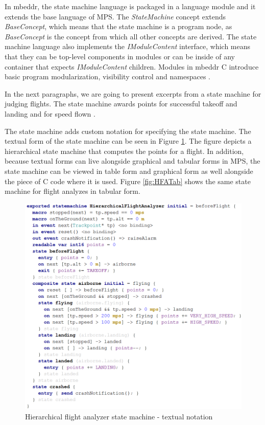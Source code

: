 \documentclass[preprint,numbers,10pt]{sigplanconf}
\begin{document}
In mbeddr, the state machine language is packaged in a language module and it
extends the base language of MPS. The \emph{StateMachine} concept extends
\emph{BaseConcept}, which means that the state machine is a program node,
as \emph{BaseConcept} is the concept from which all other concepts are derived.
The state machine language also implements the \emph{IModuleContent} interface,
which means that they can be top-level components in modules or can be inside of any
container that expects \emph{IModuleContent} children. Modules in mbeddr C
introduce basic program modularization, visibility control and namespaces \cite{voelter2013mbeddr}.

In the next paragraphs, we are going to present excerpts from a state machine for
judging flights. The state machine awards points for successful
takeoff and landing and for speed flown \cite{voelter2014generic}.

The state machine adds custom notation for specifying the state machine. The textual
form of the state machine can be seen in Figure \ref{fig:HFAT}. The figure depicts a hierarchical state machine
that computes the points for a flight.
In addition, because textual forms can live alongside graphical and tabular forms in MPS, 
the state machine can be viewed in table form and graphical form as well alongside the piece of C code
where it is used. Figure \ref{fig:HFATab} shows the same state machine for flight analyzes in tabular form.

\begin{figure}[H]
	\centering
	\includegraphics[scale=0.5]{screens/HierarchicalFlightAnalyzerT}
	\caption{Hierarchical flight analyzer state machine - textual notation}
	\label{fig:HFAT}
\end{figure}
\end{document}
